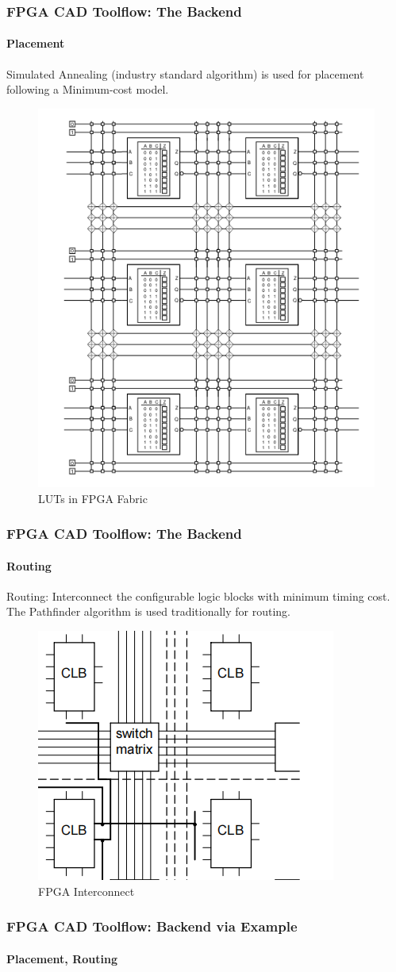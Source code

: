 \documentclass{beamer}
\begin{document}
{\begin{frame}[fragile]
\end{frame}


\begin{frame}[fragile]
  \frametitle{FPGA CAD Toolflow: The Backend}
  \framesubtitle{Placement}
  Simulated Annealing (industry standard algorithm) is used for placement
  following a Minimum-cost model. 
  \begin{figure}
    \centering
    \includegraphics[width=0.35\linewidth]{images/Lut_bare.png}
    \caption{LUTs in FPGA Fabric\cite{brown92}}
    \label{exa-fabric}
  \end{figure}

\end{frame}

\begin{frame}[fragile]
  \frametitle{FPGA CAD Toolflow: The Backend}
  \framesubtitle{Routing}
  Routing: Interconnect the configurable logic blocks with minimum timing cost.
  The Pathfinder algorithm is used traditionally for routing.
  \begin{figure}
    \centering
    \includegraphics[width=0.5\linewidth]{images/switch_matrix.png}
    \caption{FPGA Interconnect}
    \label{exa_interconnect}
  \end{figure}
\end{frame}

\begin{frame}[fragile]
  \frametitle{FPGA CAD Toolflow: Backend via Example}
  \framesubtitle{Placement, Routing}


\end{frame}}
\end{document}
